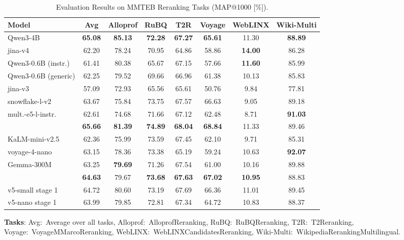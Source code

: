\documentclass[11pt]{article}
\begin{document}
\begin{table}[H]
\caption{Evaluation Results on MMTEB Reranking Tasks (MAP@1000 [\%]).}
\label{tab:reranking_multi_results}
\centering
\small
\setlength{\tabcolsep}{3pt}
\begin{tabular}{l*{7}{c}}
\toprule
\textbf{Model} & \textbf{Avg} & \textbf{Alloprof} & \textbf{RuBQ} & \textbf{T2R} & \textbf{Voyage} & \textbf{WebLINX} & \textbf{Wiki-Multi} \\
\midrule
Qwen3-4B & \textbf{65.08} & \textbf{85.13} & \textbf{72.28} & \textbf{67.27} & \textbf{65.61} & 11.30 & \textbf{88.89} \\
jina-v4 & 62.20 & 78.24 & 70.95 & 64.86 & 58.86 & \textbf{14.00} & 86.28 \\
\midrule
Qwen3-0.6B (instr.) & 61.41 & 80.38 & 65.67 & 67.15 & 57.66 & \textbf{11.60} & 85.99 \\
Qwen3-0.6B (generic) & 62.25 & 79.52 & 69.66 & 66.96 & 61.38 & 10.13 & 85.83 \\
jina-v3 & 57.09 & 72.93 & 65.56 & 65.61 & 50.76 & 9.84 & 77.81 \\
snowflake-l-v2 & 63.67 & 75.84 & 73.75 & 67.57 & 66.63 & 9.05 & 89.18 \\
mult.-e5-l-instr. & 62.61 & 74.68 & 71.66 & 67.12 & 62.48 & 8.71 & \textbf{91.03} \\
\JEmbeddingVFiveTextSmallShort{} & \textbf{65.66} & \textbf{81.39} & \textbf{74.89} & \textbf{68.04} & \textbf{68.84} & 11.33 & 89.46 \\
\midrule
KaLM-mini-v2.5 & 62.36 & 75.99 & 73.59 & 67.45 & 62.10 & 9.71 & 85.31 \\
voyage-4-nano & 63.15 & 78.36 & 73.38 & 65.19 & 59.24 & 10.63 & \textbf{92.07} \\
Gemma-300M & 63.25 & \textbf{79.69} & 71.26 & 67.54 & 61.00 & 10.16 & 89.88 \\
\JEmbeddingVFiveTextNanoShort{} & \textbf{64.63} & 79.67 & \textbf{73.68} & \textbf{67.63} & \textbf{67.02} & \textbf{10.95} & 88.83 \\
\midrule
v5-small stage 1 & 64.72 & 80.60 & 73.19 & 67.69 & 66.36 & 11.01 & 89.45 \\
v5-nano stage 1 & 63.99 & 79.85 & 72.81 & 67.34 & 64.72 & 10.83 & 88.37 \\
\bottomrule
\end{tabular}
\begin{flushleft}
\textbf{Tasks}: Avg:~Average over all tasks, Alloprof:~AlloprofReranking, RuBQ:~RuBQReranking, T2R:~T2Reranking, Voyage:~VoyageMMarcoReranking, WebLINX:~WebLINXCandidatesReranking, Wiki-Multi:~WikipediaRerankingMultilingual.
\end{flushleft}
\end{table}
\end{document}
